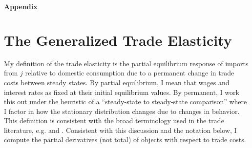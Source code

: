 \documentclass[12pt,pdftex]{article}
\begin{document}
\begin{onehalfspacing}
\newpage




\appendix

\clearpage
\newpage

\begin{center}
\textbf{\Large Appendix}
\end{center}





\section{The Generalized Trade Elasticity}

My definition of the trade elasticity is the partial equilibrium response of imports from $j$ relative to domestic consumption due to a permanent change in trade costs between steady states. By partial equilibrium, I mean that wages and interest rates as fixed at their initial equilibrium values. By permanent, I work this out under the heuristic of a ``steady-state to steady-state comparison'' where I factor in how the stationary distribution changes due to changes in behavior. This definition is consistent with the broad terminology used in the trade literature, e.g. \citet{arkolakis2012new} and \citet{simonovska2014elasticity}. Consistent with this discussion and the notation below, I compute the partial derivatives (not total) of objects with respect to trade costs.


\end{onehalfspacing}
\end{document}
